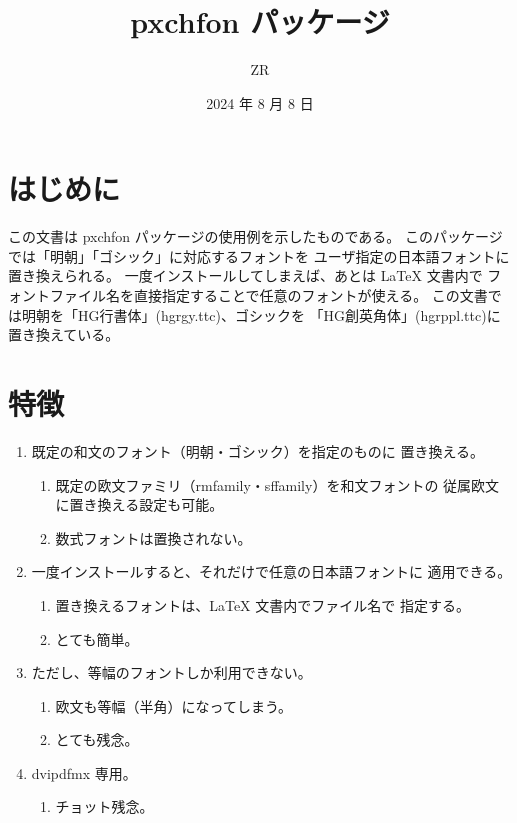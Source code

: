 \documentclass[a4paper]{jsarticle}
\begin{document}
\title{pxchfon パッケージ}
\author{ZR}
\date{2024 年 8 月 8 日}
\maketitle

\section{はじめに}
この文書は pxchfon パッケージの使用例を示したものである。
このパッケージでは「明朝」「ゴシック」に対応するフォントを
ユーザ指定の日本語フォントに置き換えられる。
一度インストールしてしまえば、あとは {\LaTeX} 文書内で
フォントファイル名を直接指定することで任意のフォントが使える。
この文書では明朝を「HG行書体」(hgrgy.ttc)、ゴシックを
\textsf{「HG創英角体」(hgrppl.ttc)}に置き換えている。

\section{特徴}
\begin{enumerate}
\item 既定の和文のフォント（明朝・ゴシック）を指定のものに
  置き換える。
  \begin{enumerate}
  \item 既定の欧文ファミリ（rmfamily・sffamily）を和文フォントの
    従属欧文に置き換える設定も可能。
  \item 数式フォントは置換されない。
  \end{enumerate}
\item 一度インストールすると、それだけで任意の日本語フォントに
  適用できる。
  \begin{enumerate}
  \item 置き換えるフォントは、{\LaTeX} 文書内でファイル名で
    指定する。
  \item とても簡単。
  \end{enumerate}
\item ただし、等幅のフォントしか利用できない。
  \begin{enumerate}
  \item 欧文も等幅（半角）になってしまう。
  \item とても残念。
  \end{enumerate}
\item dvipdfmx 専用。
  \begin{enumerate}
  \item チョット残念。
  \end{enumerate}
\end{enumerate}
\end{document}
